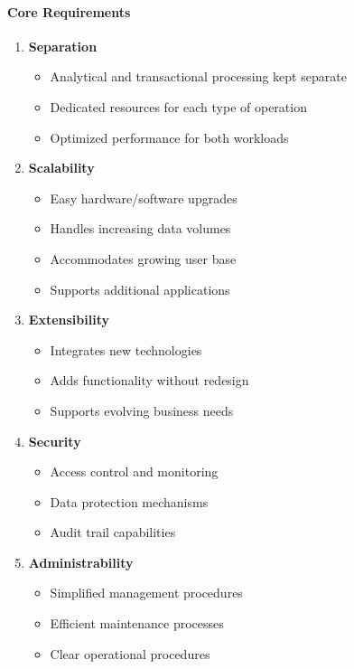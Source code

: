 \documentclass[a4paper,11pt]{article}
\begin{document}
\paragraph{Core Requirements}
\begin{enumerate}
    \item \textbf{Separation}
        \begin{itemize}
            \item Analytical and transactional processing kept separate
            \item Dedicated resources for each type of operation
            \item Optimized performance for both workloads
        \end{itemize}
    \item \textbf{Scalability}
        \begin{itemize}
            \item Easy hardware/software upgrades
            \item Handles increasing data volumes
            \item Accommodates growing user base
            \item Supports additional applications
        \end{itemize}
    \item \textbf{Extensibility}
        \begin{itemize}
            \item Integrates new technologies
            \item Adds functionality without redesign
            \item Supports evolving business needs
        \end{itemize}
    \item \textbf{Security}
        \begin{itemize}
            \item Access control and monitoring
            \item Data protection mechanisms
            \item Audit trail capabilities
        \end{itemize}
    \item \textbf{Administrability}
        \begin{itemize}
            \item Simplified management procedures
            \item Efficient maintenance processes
            \item Clear operational procedures
        \end{itemize}
\end{enumerate}
\end{document}
